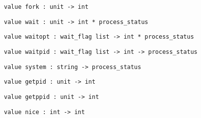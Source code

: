 \begin{verbatim}
value fork : unit -> int
\end{verbatim}
%
\begin{comment}
 Fork a new process. The returned integer is 0 for the child
           process, the pid of the child process for the parent process. 
\end{comment}
\begin{verbatim}
value wait : unit -> int * process_status
\end{verbatim}
%
\begin{comment}
 Wait until one of the children processes die, and return its pid
           and termination status. 
\end{comment}
\begin{verbatim}
value waitopt : wait_flag list -> int * process_status
\end{verbatim}
%
\begin{comment}
 Same as \verbwait, but takes a list of options to avoid blocking,
           or report also stopped children. 
\end{comment}
\begin{verbatim}
value waitpid : wait_flag list -> int -> process_status
\end{verbatim}
%
\begin{comment}
 Same as \verbwaitopt, but waits for the process whose pid is given. 
\end{comment}
\begin{verbatim}
value system : string -> process_status
\end{verbatim}
%
\begin{comment}
 Execute the given command, wait until it terminates, and return
           its termination status. The string is interpreted by the shell
           \verb/bin/sh and therefore can contain redirections, quotes, variables,
           etc. The result \verbWEXITED 127 indicates that the shell couldn't
           be executed. 
\end{comment}
\begin{verbatim}
value getpid : unit -> int
\end{verbatim}
%
\begin{comment}
 Return the pid of the process. 
\end{comment}
\begin{verbatim}
value getppid : unit -> int
\end{verbatim}
%
\begin{comment}
 Return the pid of the parent process. 
\end{comment}
\begin{verbatim}
value nice : int -> int
\end{verbatim}
%
\begin{comment}
 Change the process priority. The integer argument is added to the
           ``nice'' value. (Higher values of the ``nice'' value mean
           lower priorities.) Return the new nice value. 
\end{comment}
